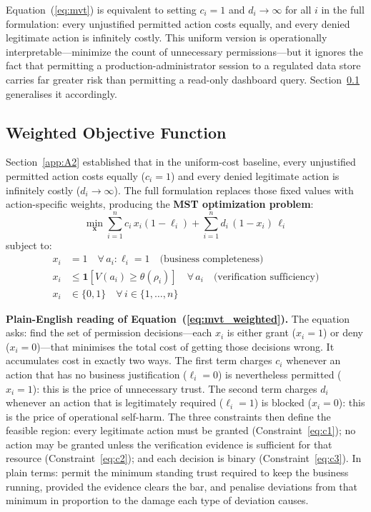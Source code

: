 \documentclass[unnumsec,webpdf,contemporary,large]{oup-authoring-template}
\theoremstyle{thmstyleone}
\theoremstyle{thmstyletwo}
\theoremstyle{thmstylethree}
\begin{document}
\begin{appendices}
\begin{itemize}
\end{itemize}

Equation~(\ref{eq:mvt}) is equivalent to setting $c_i = 1$ and $d_i \to \infty$
for all $i$ in the full formulation: every unjustified permitted action costs equally,
and every denied legitimate action is infinitely costly. This uniform version is
operationally interpretable---minimize the count of unnecessary permissions---but it
ignores the fact that permitting a production-administrator session to a regulated
data store carries far greater risk than permitting a read-only dashboard query.
Section~\ref{app:A3} generalises it accordingly.

\subsection{Weighted Objective Function}
\label{app:A3}

Section~\ref{app:A2} established that in the uniform-cost baseline, every unjustified
permitted action costs equally ($c_i = 1$) and every denied legitimate action is
infinitely costly ($d_i \to \infty$). The full formulation replaces those fixed
values with action-specific weights, producing the \textbf{MST optimization problem}:
\begin{equation}
\min_{\mathbf{x}} \sum_{i=1}^{n} c_i\, x_i (1 - \ell_i)
+ \sum_{i=1}^{n} d_i\, (1 - x_i)\, \ell_i
\label{eq:mvt_weighted}
\end{equation}
subject to:
\begin{align}
x_i &= 1 \quad \forall\, a_i : \ell_i = 1 \quad \text{(business completeness)}
\label{eq:c1} \\
x_i &\leq \mathbf{1}[V(a_i) \geq \theta(\rho_i)] \quad \forall\, a_i
\quad \text{(verification sufficiency)}
\label{eq:c2} \\
x_i &\in \{0,1\} \quad \forall\, i \in \{1,\ldots,n\}
\label{eq:c3}
\end{align}

\textbf{Plain-English reading of Equation~(\ref{eq:mvt_weighted}).}
The equation asks: find the set of permission decisions---each $x_i$ is either
grant ($x_i = 1$) or deny ($x_i = 0$)---that minimises the total cost of
getting those decisions wrong. It accumulates cost in exactly two ways. The first
term charges $c_i$ whenever an action that has no business justification
($\ell_i = 0$) is nevertheless permitted ($x_i = 1$): this is the price of
unnecessary trust. The second term charges $d_i$ whenever an action that is
legitimately required ($\ell_i = 1$) is blocked ($x_i = 0$): this is the price of
operational self-harm. The three constraints then define the feasible region: every
legitimate action must be granted (Constraint~\ref{eq:c1}); no action may be
granted unless the verification evidence is sufficient for that resource
(Constraint~\ref{eq:c2}); and each decision is binary (Constraint~\ref{eq:c3}).
In plain terms: permit the minimum standing trust required to keep the business
running, provided the evidence clears the bar, and penalise deviations from that
minimum in proportion to the damage each type of deviation causes.


\end{appendices}
\end{document}
